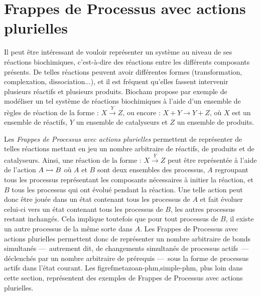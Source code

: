 \section{Frappes de Processus avec actions plurielles}

Il peut être intéressant de vouloir représenter un système au niveau de ses réactions biochimiques,
c'est-à-dire des réactions entre les différents composants présents.
De telles réactions peuvent avoir différentes formes
(transformation, complexation, dissociation...),
et il est fréquent qu'elles fassent intervenir plusieurs réactifs et plusieurs produits.
Biocham \cite{fages2004modelling}
propose par exemple de modéliser un tel système de réactions biochimiques à l'aide
d'un ensemble de règles de réaction de la forme :
$X \xrightarrow{Y} Z$,
ou encore :
$X + Y \rightarrow Y + Z$,
où $X$ est un ensemble de réactifs, $Y$ un ensemble de catalyseurs et $Z$ un ensemble de produits.

\myskip

Les \emph{Frappes de Processus avec actions plurielles} permettent de représenter de telles réactions
mettant en jeu un nombre arbitraire de réactifs, de produits et de catalyseurs.
Ainsi, une réaction de la forme : $X \xrightarrow{Y} Z$
peut être représentée à l'aide de l'action $\mbox{$A \rightarrowtail B$}$
où $A$ et $B$ sont deux ensembles des processus,
$A$ regroupant tous les processus représentant les composants nécessaires à initier la réaction,
et $B$ tous les processus qui ont évolué pendant la réaction.
Une telle action peut donc être jouée dans un état contenant tous les processus de $A$
et fait évoluer celui-ci vers un état contenant tous les processus de $B$, %
les autres processus restant inchangés. %
Cela implique toutefois que pour tout processus de $B$, il existe un autre processus de la même
sorte dans $A$.
Les Frappes de Processus avec actions plurielles permettent donc de représenter
un nombre arbitraire de bonds simultanés
---~autrement dit, de changements simultanés de processus actifs~---
déclenchés par un nombre arbitraire de prérequis
---~sous la forme de processus actifs dans l'état courant.
Les figref{metazoan-phm,simple-phm},
plus loin dans cette section,
représentent des exemples de Frappes de Processus avec actions plurielles.

